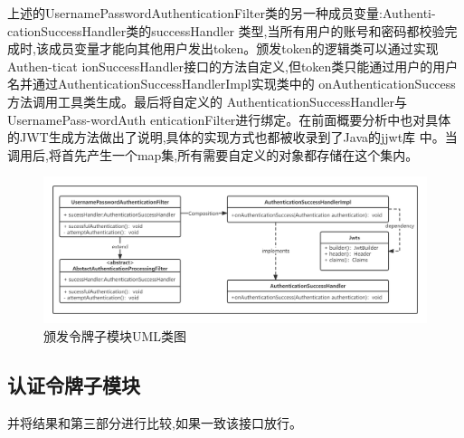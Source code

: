 上述的UsernamePasswordAuthenticationFilter类的另一种成员变量:Authenti-cationSuccessHandler类的successHandler
类型,当所有用户的账号和密码都校验完成时,该成员变量才能向其他用户发出token。颁发token的逻辑类可以通过实现Authen-ticat
ionSuccessHandler接口的方法自定义,但token类只能通过用户的用户名并通过AuthenticationSuccessHandlerImpl实现类中的
onAuthenticationSuccess方法调用工具类生成。最后将自定义的 AuthenticationSuccessHandler与 UsernamePass-wordAuth
enticationFilter进行绑定。在前面概要分析中也对具体的JWT生成方法做出了说明,具体的实现方式也都被收录到了Java的jjwt库
中。当调用后,将首先产生一个map集,所有需要自定义的对象都存储在这个集内。

\begin{figure}[htb]
    \centering
    \includegraphics[width=1\textwidth]{my_figures/chapter5/颁发令牌子模块UML类图.png}
    \caption{颁发令牌子模块UML类图}
    \label{fig:颁发令牌子模块UML类图}
\end{figure}

\subsection{认证令牌子模块}


并将结果和第三部分进行比较,如果一致该接口放行。

